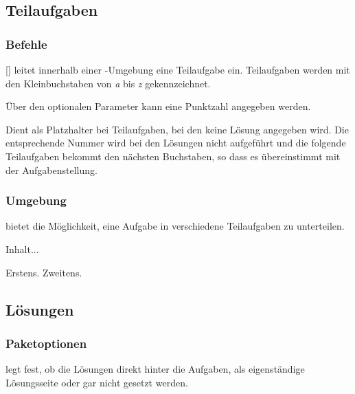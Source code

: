 \subsection{Teilaufgaben}

\subsubsection{Befehle}
\begin{commands}
    [] leitet innerhalb einer -Umgebung eine Teilaufgabe ein. Teilaufgaben werden mit den Kleinbuchstaben von \textit{a} bis \textit{z} gekennzeichnet.

    Über den optionalen Parameter kann eine Punktzahl angegeben werden.

     Dient als Platzhalter bei Teilaufgaben, bei den keine Lösung angegeben wird. Die entsprechende Nummer wird bei den Lösungen nicht aufgeführt und die folgende Teilaufgaben bekommt den nächsten Buchstaben, so dass es übereinstimmt mit der Aufgabenstellung.
\end{commands}

\subsubsection{Umgebung}
\begin{environments}
     bietet die Möglichkeit, eine Aufgabe in verschiedene Teilaufgaben zu unterteilen.
    \begin{sourcecode}[gobble=8]
        \begin{aufgabe}
            Inhalt...
            \begin{teilaufgaben}
                \teilaufgabe Erstens.
                \teilaufgabe[5] Zweitens.
            \end{teilaufgaben}
        \end{aufgabe}
    \end{sourcecode}
\end{environments}

\subsection{Lösungen}

\subsubsection{Paketoptionen}\label{subsubsec:paketoptionen}
\begin{options}
        legt fest, ob die Lösungen direkt hinter die Aufgaben, als eigenständige Lösungsseite oder gar nicht gesetzt werden.

\end{options}

